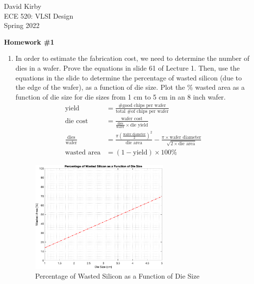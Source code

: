 \documentclass[11pt]{article}
\begin{document}

\hypersetup{
    linkcolor=CrispBlue,
    urlcolor=CrispBlue,
    breaklinks=true
}

David Kirby\\
ECE 520: VLSI Design\\
Spring 2022

\begin{center}
    \large\bfseries Homework \#1
\end{center}

\begin{enumerate}
    \item In order to estimate the fabrication cost, we need to determine the number of dies in a wafer. Prove the equations in slide 61 of Lecture 1. Then, use the equations in the slide to determine the percentage of wasted silicon (due to the edge of the wafer), as a function of die size. Plot the \% wasted area as a function of die size for die sizes from 1 cm to 5 cm in an 8 inch wafer.
    \begin{align}
        \text{yield} &= \frac{\text{\# good chips per wafer}}{\text{total \# of chips per wafer}}\\[1em]
        \text{die cost} &= \frac{\text{wafer cost}}{\frac{\text{dies}}{\text{wafer}}\times\text{die yield}}\\[1em]
        \frac{\text{dies}}{\text{wafer}} &= \frac{\pi\left(\frac{\text{wafer diameter}}{2}\right)^2}{\text{die area}} - \frac{\pi \times \text{wafer diameter}}{\sqrt{2 \times \text{die area}}}\\[1em]
        \text{wasted area} &= (1 - \text{yield}) \times 100\%
    \end{align}
    \begin{figure}[!ht]
    \centering
    \includegraphics[width=0.65\textwidth]{figure01.png}
    \caption{Percentage of Wasted Silicon as a Function of Die Size}
    \label{fig:figure01}
    \end{figure}


\end{enumerate}
\end{document}
